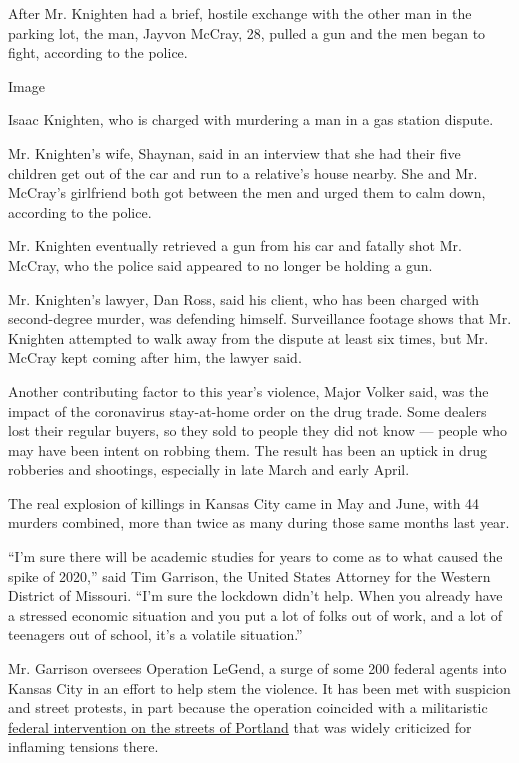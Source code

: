 After Mr. Knighten had a brief, hostile exchange with the other man in
the parking lot, the man, Jayvon McCray, 28, pulled a gun and the men
began to fight, according to the police.

Image

Isaac Knighten, who is charged with murdering a man in a gas station
dispute.

Mr. Knighten's wife, Shaynan, said in an interview that she had their
five children get out of the car and run to a relative's house nearby.
She and Mr. McCray's girlfriend both got between the men and urged them
to calm down, according to the police.

Mr. Knighten eventually retrieved a gun from his car and fatally shot
Mr. McCray, who the police said appeared to no longer be holding a gun.

Mr. Knighten's lawyer, Dan Ross, said his client, who has been charged
with second-degree murder, was defending himself. Surveillance footage
shows that Mr. Knighten attempted to walk away from the dispute at least
six times, but Mr. McCray kept coming after him, the lawyer said.

Another contributing factor to this year's violence, Major Volker said,
was the impact of the coronavirus stay-at-home order on the drug trade.
Some dealers lost their regular buyers, so they sold to people they did
not know --- people who may have been intent on robbing them. The result
has been an uptick in drug robberies and shootings, especially in late
March and early April.

The real explosion of killings in Kansas City came in May and June, with
44 murders combined, more than twice as many during those same months
last year.

``I'm sure there will be academic studies for years to come as to what
caused the spike of 2020,'' said Tim Garrison, the United States
Attorney for the Western District of Missouri. ``I'm sure the lockdown
didn't help. When you already have a stressed economic situation and you
put a lot of folks out of work, and a lot of teenagers out of school,
it's a volatile situation.''

Mr. Garrison oversees Operation LeGend, a surge of some 200 federal
agents into Kansas City in an effort to help stem the violence. It has
been met with suspicion and street protests, in part because the
operation coincided with a militaristic
\href{https://www.nytimes3xbfgragh.onion/2020/07/26/us/protests-portland-seattle-trump.html}{federal
intervention on the streets of Portland} that was widely criticized for
inflaming tensions there.

